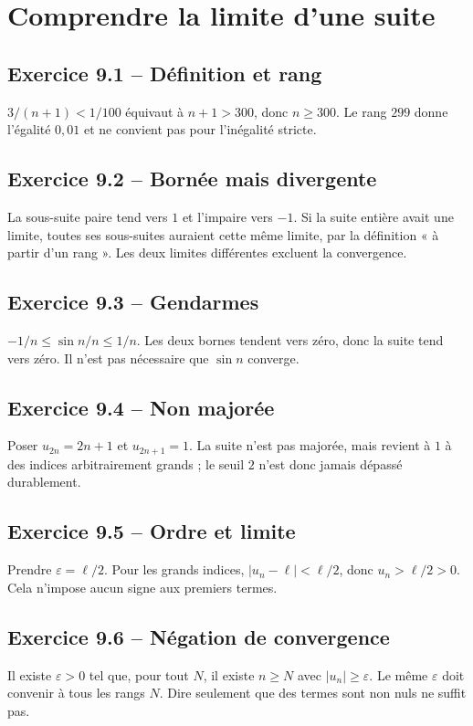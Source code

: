 \chapter{Comprendre la limite d’une suite}
\section*{Exercice 9.1 -- Définition et rang}
$3/(n+1)<1/100$ équivaut à $n+1>300$, donc $n\ge300$. Le rang $299$ donne l'égalité $0{,}01$ et ne convient pas pour l'inégalité stricte.

\section*{Exercice 9.2 -- Bornée mais divergente}
La sous-suite paire tend vers $1$ et l'impaire vers $-1$. Si la suite entière avait une limite, toutes ses sous-suites auraient cette même limite, par la définition « à partir d'un rang ». Les deux limites différentes excluent la convergence.

\section*{Exercice 9.3 -- Gendarmes}
$-1/n\le\sin n/n\le1/n$. Les deux bornes tendent vers zéro, donc la suite tend vers zéro. Il n'est pas nécessaire que $\sin n$ converge.

\section*{Exercice 9.4 -- Non majorée}
Poser $u_{2n}=2n+1$ et $u_{2n+1}=1$. La suite n'est pas majorée, mais revient à $1$ à des indices arbitrairement grands ; le seuil $2$ n'est donc jamais dépassé durablement.

\section*{Exercice 9.5 -- Ordre et limite}
Prendre $\varepsilon=\ell/2$. Pour les grands indices, $|u_n-\ell|<\ell/2$, donc $u_n>\ell/2>0$. Cela n'impose aucun signe aux premiers termes.

\section*{Exercice 9.6 -- Négation de convergence}
Il existe $\varepsilon>0$ tel que, pour tout $N$, il existe $n\ge N$ avec $|u_n|\ge\varepsilon$. Le même $\varepsilon$ doit convenir à tous les rangs $N$. Dire seulement que des termes sont non nuls ne suffit pas.
